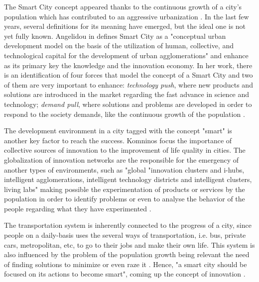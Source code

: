 The Smart City concept appeared thanks to the continuous growth of a city's population which has contributed to an aggressive urbanization \cite{kn:Cecilia2016}. In the last few years, several definitions for its meaning have emerged, but the ideal one is not yet fully known. Angelidou in \cite{kn:Angelidou2015} defines Smart City as a "conceptual urban development model on the basis of the utilization of human, collective, and technological capital for the development of urban agglomerations" and enhance as its primary key the knowledge and the innovation economy. In her work, there is an identification of four forces that model the concept of a Smart City and two of them are very important to enhance: \textit{technology push}, where new products and solutions are introduced in the market regarding the fast advance in science and technology; \textit{demand pull}, where solutions and problems are developed in order to respond to the society demands, like the continuous growth of the population \cite{kn:Angelidou2015}.

The development environment in a city tagged with the concept "smart" is another key factor to reach the success. Komninos focus the importance of collective sources of innovation to the improvement of life quality in cities. The globalization of innovation networks are the responsible for the emergency of another types of environments, such as "global "innovation clusters and i-hubs, intelligent agglomerations, intelligent technology districts and intelligent clusters, living labs" making possible the experimentation of products or services by the population in order to identify problems or even to analyse the behavior of the people regarding what they have experimented \cite{kn:Komninos2009}.

The transportation system is inherently connected to the progress of a city, since people on a daily-basis uses the several ways of transportation, i.e. bus, private cars, metropolitan, etc, to go to their jobs and make their own life. This system is also influenced by the problem of the population growth being relevant the need of finding solutions to minimize or even raze it \cite{kn:Caragliu2015}. Hence, "a smart city should be focused on its actions to become smart", coming up the concept of innovation \cite{kn:Cecilia2016}.

